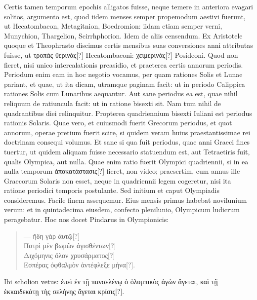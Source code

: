 Certis tamen temporum
epochis alligatos fuisse, neque temere in anteriora evagari solitos,
argumento est, quod iidem menses semper propemodum aestivi
fuerunt, ut Hecatombaeon, Metagitnion, Boedromion: iidam etiam
semper verni, Munychion, Thargelion, Scirrhphorion.
Idem de aliis censendum.
Ex Aristotele quoque et Theophrasto discimus
certis mensibus suas conversiones anni attributas fuisse,
 ut \textgreek{τροπὰς θερινὰς[?]}
Hecatombaeoni: \textgreek{χειμερινὰς[?]} Posideoni.
Quod non fieret, nisi unico
intercalationis preasidio, et praeterea certis annorum periodis.
Periodum
enim eam in hoc negotio vocamus, per quam rationes Solis
et Lunae pariant, et quae, ut ita dicam, utramque paginam facit: ut in
periodo Calippica rationes Solis cum Lunaribus aequantur.
Aut sane
periodus ea est, quae nihil reliquum de ratiuncula facit: ut in ratione
bisexti sit.
Nam tum nihil de quadrantibus diei relinquitur.
Propterea
quadriennium bisexti Iuliani est periodus rationis Solaris.
Quae vero, et cuiusmodi fuerit Grecorum periodus, et quot annorum,
operae pretium fuerit scire, si quidem veram huius praestantissimae rei
doctrinam consequi volumus.
Et sane si qua fuit periodus, quae anni
Graeci fines tuertur, ut quidem aliquam fuisse necessario statuendum
est, aut Tetraetiris fuit, qualis Olympica, aut nulla.
Quae enim ratio
fuerit Olympici quadriennii, si in ea nulla temporum
 \textgreek{ἀποκατάστασις[?]} fieret,
non video;
praesertim, cum annus ille Graecorum Solaris non esset,
neque in quadriennii legem cogeretur, nisi ita ratione periodici temporis
postulante.
Sed initium et caput Olympiadis consideremus.
%
Facile finem assequemur.
Eius mensis primus habebat novilunium verum:
et in quintadecima eiusdem, confecto plenilunio, Olympicum ludicrum
peragebatur.
Hoc nos docet Pindarus in Olympionicis:
\begin{verse}
\textgreek{— ἤδη γὰρ ἀυτῷ[?]}\\
\textgreek{Πατρὶ μὲν βωμῶν ἁγισθέντων[?]}\\
\textgreek{Διχόμηνις ὄλον χρυσάρματος[?]}\\
\textgreek{Εσπέρας ὀφθαλμὸν ἀντέφλεξε μήνα[?]}.
\end{verse}
Ibi scholion vetus:
 \textgreek{ἐπεὶ ἐν τῇ πανσελένῳ ὁ ὁλυμπικὸς ἀγὼν ἄγεται, καὶ τῇ ἑκκαιδεκάτῃ
τὴς σελήνης ἄγεται κρίσις[?]}.
